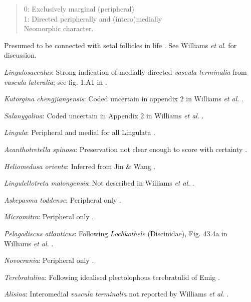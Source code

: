 \documentclass[openany]{book}
\theoremstyle{definition}
\theoremstyle{definition}
\theoremstyle{definition}
\theoremstyle{remark}
\begin{document}
\begin{quote}
0: Exclusively marginal (peripheral)\\
1: Directed peripherally and (intero)medially\\
Neomorphic character.
\end{quote}

Presumed to be connected with setal follicles in life
\citep{Williams1998Thediversity}. See Williams \emph{et al}.
\citeyearpar{Williams2000BrachiopodaLinguliformea} for discussion.

\emph{Lingulosacculus}: Strong indication of medially directed
\emph{vascula} \emph{terminalia} from \emph{vascula} \emph{lateralia};
see fig. 1.A1 in \citet{Balthasar2009EarlyCambrian}.

\emph{Kutorgina chengjiangensis}: Coded uncertain in appendix 2 in
Williams \emph{et al}. \citeyearpar{Williams1998Thediversity}.

\emph{Salanygolina}: Coded uncertain in Appendix 2 in Williams \emph{et
al}. \citeyearpar{Williams1998Thediversity}.

\emph{Lingula}: Peripheral and medial for all Lingulata
\citep{Williams2000BrachiopodaLinguliformea}.

\emph{Acanthotretella spinosa}: Preservation not clear enough to score
with certainty \citep{Holmer2006Aspinose}.

\emph{Heliomedusa orienta}: Inferred from Jin \& Wang
\citeyearpar{Jin1992Revisionof}.

\emph{Lingulellotreta malongensis}: Not described in Williams \emph{et
al}. \citeyearpar{Williams2000BrachiopodaLinguliformea}.

\emph{Askepasma toddense}: Peripheral only
\citep{Williams1998Thediversity, Williams2000BrachiopodaLinguliformea}.

\emph{Micromitra}: Peripheral only
\citep{Williams1998Thediversity, Williams2000BrachiopodaLinguliformea}.

\emph{Pelagodiscus atlanticus}: Following \emph{Lochkothele}
(Discinidae), Fig. 43.4a in Williams \emph{et al}.
\citeyearpar{Williams2000BrachiopodaLinguliformea}.

\emph{Novocrania}: Peripheral only
\citep[p.158]{Williams2000BrachiopodaLinguliformea}.

\emph{Terebratulina}: Following idealised plectolophous terebratulid of
Emig \citeyearpar{Emig1992Functionaldisposition}.

\emph{Alisina}: Interomedial \emph{vascula} \emph{terminalia} not
reported by Williams \emph{et al}.
\citeyearpar{Williams2000BrachiopodaLinguliformea}.
\end{document}
